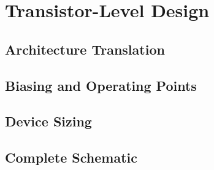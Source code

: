 
\section{Transistor-Level Design}
\label{sec:transistor_level}

\subsection{Architecture Translation}



\subsection{Biasing and Operating Points}



\subsection{Device Sizing}



\subsection{Complete Schematic}

